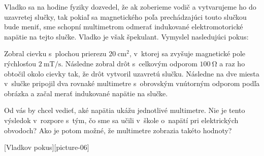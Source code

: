 Vladko sa na hodine fyziky dozvedel, že ak zoberieme vodič a vytvarujeme
ho do uzavretej slučky, tak pokiaľ sa magnetického poľa
prechádzajúci touto slučkou bude meniť, sme schopní multimetrom odmerať
indukované elektromotorické napätie na tejto slučke. Vladko je však
špekulant. Vymyslel nasledujúci pokus:

Zobral cievku s~plochou prierezu $\SI{20}{\centi\metre\squared}$, v~ktorej sa zvyšuje magnetické pole rýchlosťou
$\SI{2}{\milli\tesla\per\second}$. Následne zobral drôt s~celkovým odporom $\SI{100}{\ohm}$ a raz ho obtočil okolo cievky tak, že drôt
vytvoril uzavretú slučku. Následne na dve miesta v~slučke pripojil dva rovnaké multimetre s~obrovským vnútorným odporom podľa obrázka a začal
merať indukované napätie na slučke.

Od vás by chcel vedieť, aké napätia ukážu jednotlivé multimetre. Nie je
tento výsledok v~rozpore s~tým, čo sme sa učili v~škole o~napätí pri
elektrických obvodoch? Ako je potom možné, že multimetre zobrazia takéto
hodnoty?

[Vladkov pokus][picture-06]
